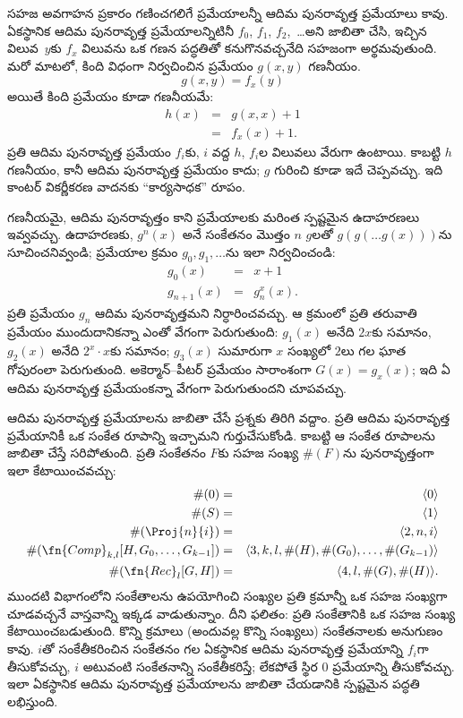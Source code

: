 \documentclass[../../../include/open-logic-section]{subfiles}
\begin{document}

సహజ అవగాహన ప్రకారం గణించగలిగే ప్రమేయాలన్నీ ఆదిమ పునరావృత్త ప్రమేయాలు
కావు. ఏకస్థానిక ఆదిమ పునరావృత్త ప్రమేయాలన్నిటినీ
$f_0$, $f_1$, $f_2$,~\dots అని జాబితా చేసి, ఇచ్చిన విలువ~$y$కు $f_x$
విలువను ఒక గణన పద్ధతితో కనుగొనవచ్చనేది సహజంగా అర్థమవుతుంది. మరో
మాటలో, కింది విధంగా నిర్వచించిన ప్రమేయం $g(x,y)$ గణనీయం.
\[
g(x,y) = f_x(y)
\]
అయితే కింది ప్రమేయం కూడా గణనీయమే:
\begin{eqnarray*}
h(x) & = & g(x,x) + 1 \\
& = & f_x(x) +1.
\end{eqnarray*}
ప్రతి ఆదిమ పునరావృత్త ప్రమేయం $f_i$కు, $i$ వద్ద $h$, $f_i$ల విలువలు
వేరుగా ఉంటాయి. కాబట్టి $h$ గణనీయం, కానీ ఆదిమ పునరావృత్త ప్రమేయం
కాదు; $g$ గురించి కూడా ఇదే చెప్పవచ్చు. ఇది కాంటర్ వికర్ణీకరణ వాదనకు
``కార్యసాధక'' రూపం.

గణనీయమై, ఆదిమ పునరావృత్తం కాని ప్రమేయాలకు మరింత స్పష్టమైన ఉదాహరణలు
ఇవ్వవచ్చు. ఉదాహరణకు, $g^n(x)$ అనే సంకేతనం మొత్తం $n$ $g$లతో
$g(g(\dots g(x)))$ను సూచించనివ్వండి; ప్రమేయాల క్రమం
$g_0,g_1,\dots$ను ఇలా నిర్వచించండి:
\begin{eqnarray*}
g_0(x) & = & x+1 \\
g_{n + 1}(x) & = & g_n^x(x).
\end{eqnarray*}
ప్రతి ప్రమేయం $g_n$ ఆదిమ పునరావృత్తమని నిర్ధారించవచ్చు. ఆ క్రమంలో ప్రతి తరువాతి
ప్రమేయం ముందుదానికన్నా ఎంతో వేగంగా పెరుగుతుంది: $g_1(x)$ అనేది
$2x$కు సమానం, $g_2(x)$ అనేది $2^x\cdot x$కు సమానం; $g_3(x)$
సుమారుగా $x$ సంఖ్యలో $2$లు గల ఘాత
గోపురంలా పెరుగుతుంది. అకెర్మాన్--పీటర్ ప్రమేయం సారాంశంగా
$G(x)=g_x(x)$; ఇది ఏ ఆదిమ పునరావృత్త ప్రమేయంకన్నా వేగంగా పెరుగుతుందని
చూపవచ్చు.

ఆదిమ పునరావృత్త ప్రమేయాలను జాబితా చేసే ప్రశ్నకు తిరిగి వద్దాం. ప్రతి
ఆదిమ పునరావృత్త ప్రమేయానికీ ఒక సంకేత రూపాన్ని ఇచ్చామని
గుర్తుచేసుకోండి. కాబట్టి ఆ సంకేత రూపాలను జాబితా చేస్తే సరిపోతుంది. ప్రతి
సంకేతనం $F$కు సహజ సంఖ్య $\#(F)$ను పునరావృత్తంగా ఇలా కేటాయించవచ్చు:
\begin{eqnarray*}
\#(0) & = & \langle 0 \rangle \\
\#(S) & = & \langle 1 \rangle \\
\#(\Proj{n}{i}) & = & \langle 2, n, i \rangle \\
\#(\fn{Comp}_{k,l}[H,G_0,\dots,G_{k-1}]) & = & \langle
3,k,l,\#(H),\#(G_0),\dots,\#(G_{k-1}) \rangle \\
\#(\fn{Rec}_l[G,H]) & = & \langle 4, l, \#(G), \#(H) \rangle.
\end{eqnarray*}
ముందటి విభాగంలోని సంకేతాలను ఉపయోగించి సంఖ్యల ప్రతి క్రమాన్నీ ఒక సహజ
సంఖ్యగా చూడవచ్చనే వాస్తవాన్ని ఇక్కడ వాడుతున్నాం. దీని ఫలితం: ప్రతి
సంకేతానికి ఒక సహజ సంఖ్య కేటాయించబడుతుంది. కొన్ని క్రమాలు (అందువల్ల
కొన్ని సంఖ్యలు) సంకేతనాలకు అనుగుణం కావు. $i$తో సంకేతీకరించిన
సంకేతనం గల ఏకస్థానిక ఆదిమ పునరావృత్త ప్రమేయాన్ని $f_i$గా తీసుకోవచ్చు,
$i$ అటువంటి సంకేతనాన్ని సంకేతీకరిస్తే; లేకపోతే స్థిర $0$ ప్రమేయాన్ని
తీసుకోవచ్చు. ఇలా
ఏకస్థానిక ఆదిమ పునరావృత్త ప్రమేయాలను జాబితా చేయడానికి స్పష్టమైన పద్ధతి
లభిస్తుంది.
\end{document}

